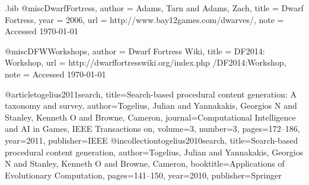 \begin{filecontents*}{\jobname.bib}
@misc{DwarfFortress,
	author 	= {Adams, Tarn and Adams, Zach},
	title 		= {{D}warf {F}ortress},
	year 		= {2006}, 
	url 		= {http://www.bay12games.com/dwarves/},
	note		= {Accessed \today}
}

@misc{DFWWorkshops,
	author 	= {Dwarf Fortress Wiki},
	title 		= {{D}{F}2014: {W}orkshop},
	url 		= {http://dwarffortresswiki.org/index.php /DF2014:Workshop},
	note		= {Accessed \today}
}

@article{togelius2011search,
  title={Search-based procedural content generation: A taxonomy and survey},
  author={Togelius, Julian and Yannakakis, Georgios N and Stanley, Kenneth O and Browne, Cameron},
  journal={Computational Intelligence and AI in Games, IEEE Transactions on},
  volume={3},
  number={3},
  pages={172--186},
  year={2011},
  publisher={IEEE}
}
@incollection{togelius2010search,
  title={Search-based procedural content generation},
  author={Togelius, Julian and Yannakakis, Georgios N and Stanley, Kenneth O and Browne, Cameron},
  booktitle={Applications of Evolutionary Computation},
  pages={141--150},
  year={2010},
  publisher={Springer}
}

\end{filecontents*}

\nocite{*}
